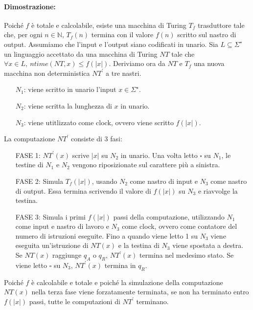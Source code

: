 \paragraph*{Dimostrazione:} Poiché $f$ è totale e calcolabile, esiste una macchina di Turing $T_{f}$ trasduttore tale che, per 
ogni $n \in \mathbb{N}$, $T_{f}(n)$ termina con il valore $f(n)$ scritto sul nastro di output. Assumiamo che l'input e l'output 
siano codificati in unario. Sia $L \subseteq \Sigma^{\star}$ un linguaggio accettato da una macchina di Turing $NT$ tale che 
$\forall x \in L,\ ntime(NT, x) \leq f(|x|)$. Deriviamo ora da $NT$ e $T_{f}$ una nuova macchina non deterministica $NT^{'}$ a tre nastri.
\begin{enumerate}
    \item [$N_{1}$:] viene scritto in unario l'input $x \in \Sigma^{\star}$.
    \item [$N_{2}$:] viene scritta la lunghezza di $x$ in unario.
    \item [$N_{3}$:] viene utitlizzato come clock, ovvero viene scritto $f(|x|)$.
\end{enumerate}
La computazione $NT^{'}$ consiste di 3 fasi:
\begin{enumerate}
    \item [FASE 1:]{
        $NT^{'}(x)$ scrive $|x|$ su $N_{2}$ in unario. Una volta letto $\square$ su $N_{1}$, le testine di $N_{1}$ e $N_{2}$
        vengono riposizionate sul carattere più a sinistra.
    }
    \item [FASE 2:]{
        Simula $T_{f}(|x|)$, usando $N_{2}$ come nastro di input e $N_{3}$ come nastro di output. Essa termina scrivendo il valore di 
        $f(|x|)$ su $N_{3}$ e riavvolge la testina.
    }
    \item [FASE 3:]{
        Simula i primi $f(|x|)$ passi della computazione, utilizzando $N_{1}$ come input e nastro di lavoro e $N_{3}$ come clock,
        ovvero come contatore del numero di istruzioni eseguite. Fino a quando viene letto 1 su $N_{3}$ viene eseguita un'istruzione di
        $NT(x)$ e la testina di $N_{3}$ viene spostata a destra. Se $NT(x)$ raggiunge $q_{A}$ o $q_{R}$, $NT^{'}(x)$ termina nel 
        medesimo stato. Se viene letto $\square$ su $N_{3}$, $NT^{'}(x)$ termina in $q_{R}$.
    }
\end{enumerate} 

Poiché $f$ è calcolabile e totale e poiché la simulazione della computazione $NT(x)$ nella terza fase viene forzatamente terminata,
se non ha terminato entro $f(|x|)$ passi, tutte le computazioni di $NT^{'}$ terminano.

